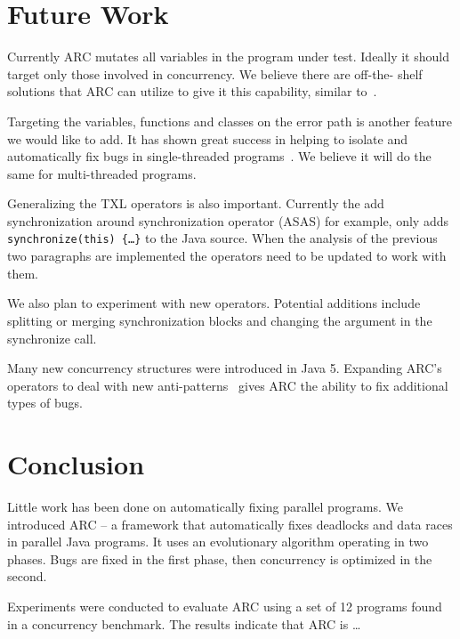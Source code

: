 \documentclass{llncs}
\begin{document}

\section{Future Work}
\label{sec:future_work}

Currently ARC mutates all variables in the program under test. Ideally it
should target only those involved in concurrency. We believe there are off-the-
shelf solutions that ARC can utilize to give it this capability, similar
to~\cite{CM08, HP00}.

Targeting the variables, functions and classes on the error path is another
feature we would like to add. It has shown great success in helping to isolate
and automatically fix bugs in single-threaded programs~\cite{FNWG09, NWLF09,
WFGN10, GNFW11}. We believe it will do the same for multi-threaded programs.

Generalizing the TXL operators is also important. Currently the add
synchronization around synchronization operator (ASAS) for example, only adds
\texttt{synchronize(this) \{\ldots\}} to the Java source. When the analysis of
the previous two paragraphs are implemented the operators need to be updated to
work with them.

We also plan to experiment with new operators. Potential additions include
splitting or merging synchronization blocks and changing the argument in the
synchronize call.

Many new concurrency structures were introduced in Java 5. Expanding ARC's
operators to deal with new anti-patterns~\cite{BJ09, BCD06} gives ARC the
ability to fix additional types of bugs.

\section{Conclusion}
\label{sec:conclusion}

Little work has been done on automatically fixing parallel programs. We
introduced ARC -- a framework that automatically fixes deadlocks and data races
in parallel Java programs. It uses an evolutionary algorithm operating in two
phases. Bugs are fixed in the first phase, then concurrency is optimized in the
second.

Experiments were conducted to evaluate ARC using a set of 12 programs found in
a concurrency benchmark. The results indicate that ARC is \ldots %



\end{document}
